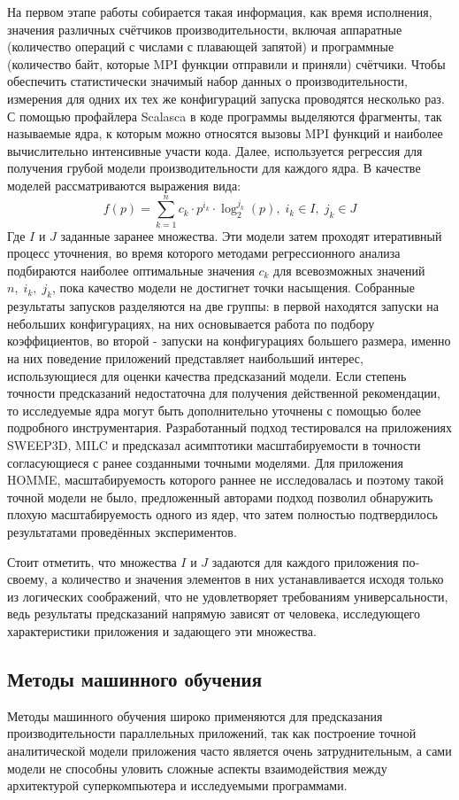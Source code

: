 		На первом этапе работы собирается такая информация, как время исполнения, значения различных счётчиков производительности, включая аппаратные (количество операций с числами с плавающей запятой) и программные (количество байт, которые MPI функции отправили и приняли) счётчики. Чтобы обеспечить статистически значимый набор данных о производительности, измерения для одних их тех же конфигураций запуска проводятся несколько раз. С помощью профайлера Scalasca в коде программы выделяются фрагменты, так называемые ядра, к которым можно относятся вызовы MPI функций и наиболее вычислительно интенсивные участи кода. Далее, используется регрессия для получения грубой модели производительности для каждого ядра. В качестве моделей рассматриваются выражения вида:
		\[
		f(p) = \sum \limits_{k=1}^{n} c_k \cdot p^{i_k} \cdot \log_2^{j_k}(p),\; i_k \in I,\; j_k \in J 
		\]
		Где \(I\) и \(J\) заданные заранее множества. Эти модели затем проходят итеративный процесс уточнения, во время которого методами регрессионного анализа подбираются наиболее оптимальные значения \(c_k\) для всевозможных значений \(n,\;i_{k},\;j_{k}\), пока качество модели не достигнет точки насыщения. Собранные результаты запусков разделяются на две группы: в первой находятся запуски на небольших конфигурациях, на них основывается работа по подбору коэффициентов, во второй - запуски на конфигурациях большего размера, именно на них поведение приложений представляет наибольший интерес, использующиеся для оценки качества предсказаний модели. Если степень точности предсказаний недостаточна для получения действенной рекомендации, то исследуемые ядра могут быть дополнительно уточнены с помощью более подробного инструментария. Разработанный подход тестировался на приложениях SWEEP3D, MILC и предсказал асимптотики масштабируемости в точности согласующиеся с ранее созданными точными моделями. Для приложения HOMME, масштабируемость которого раннее не исследовалась и поэтому такой точной модели не было, предложенный авторами подход позволил обнаружить плохую масштабируемость одного из ядер, что затем полностью подтвердилось результатами проведённых экспериментов.

		Стоит отметить, что множества \(I\) и \(J\) задаются для каждого приложения по-своему, а количество и значения элементов в них устанавливается исходя только из логических соображений, что не удовлетворяет требованиям универсальности, ведь результаты предсказаний напрямую зависят от человека, исследующего характеристики приложения и задающего эти множества.


	\subsection{Методы машинного обучения}
		Методы машинного обучения широко применяются для предсказания производительности параллельных приложений, так как построение точной аналитической модели приложения часто является очень затруднительным, а сами модели не способны уловить сложные аспекты взаимодействия между архитектурой суперкомпьютера и исследуемыми программами.

